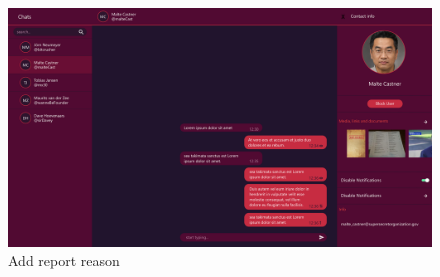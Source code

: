 \begin{figure}[h]
    \centering
    \includegraphics[width=1.0\textwidth]{./graphics/wireframes/ViewProfile}
    \caption{Add report reason}
    \label{fig:figure30}
\end{figure}
